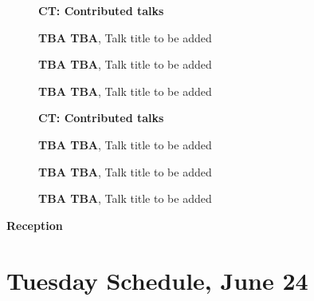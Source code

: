 \documentclass[ILAS2025-program.tex]{subfiles}
\begin{document}
\begin{description}
\begin{description}
    \item[] \textbf{CT: Contributed talks} 
    \item[] \textbf{TBA TBA}, Talk title to be added
        \item[] \textbf{TBA TBA}, Talk title to be added
        \item[] \textbf{TBA TBA}, Talk title to be added
        \end{description}
    \begin{description}
    \item[] \textbf{CT: Contributed talks} 
    \item[] \textbf{TBA TBA}, Talk title to be added
        \item[] \textbf{TBA TBA}, Talk title to be added
        \item[] \textbf{TBA TBA}, Talk title to be added
        \end{description}
    \item[\info{17:30\textrm{--}19:30}] \textbf{Reception} 
    \end{description}
    \newpage

\section{Tuesday Schedule, June 24}
    
\end{document}
